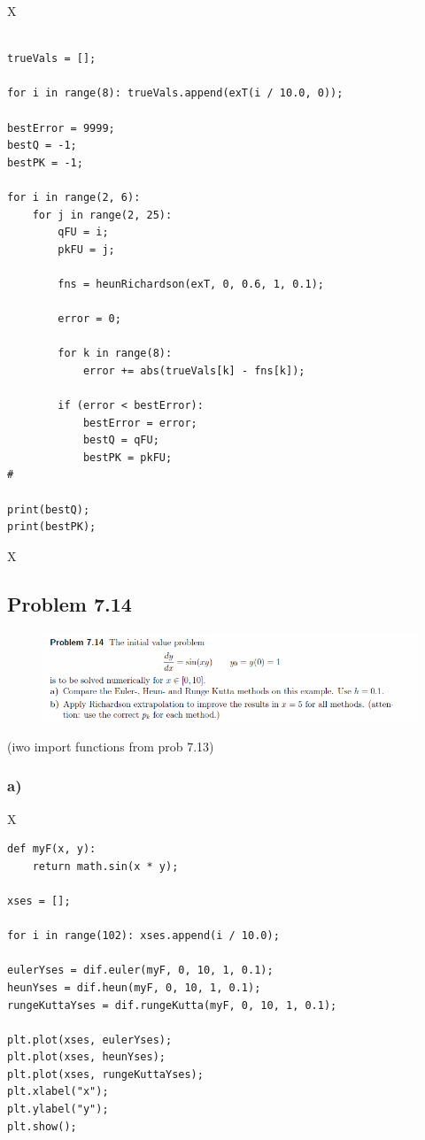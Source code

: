 X

\begin{lstlisting}[caption=todo]

trueVals = [];

for i in range(8): trueVals.append(exT(i / 10.0, 0));

bestError = 9999;
bestQ = -1;
bestPK = -1;

for i in range(2, 6):
	for j in range(2, 25):
		qFU = i;
		pkFU = j;
	
		fns = heunRichardson(exT, 0, 0.6, 1, 0.1);
		
		error = 0;
		
		for k in range(8):
			error += abs(trueVals[k] - fns[k]);
		
		if (error < bestError):
			bestError = error;
			bestQ = qFU;
			bestPK = pkFU;
#

print(bestQ);
print(bestPK);

\end{lstlisting}



X



\subsection{Problem 7.14}


\begin{figure}[!ht]
\includegraphics[width=1\textwidth]{chapters/images/desc-7-14}
\end{figure}

(iwo import functions from prob 7.13)

\subsubsection{a)}

X

\begin{lstlisting}[caption=todo]
def myF(x, y):
	return math.sin(x * y);

xses = [];

for i in range(102): xses.append(i / 10.0);

eulerYses = dif.euler(myF, 0, 10, 1, 0.1);
heunYses = dif.heun(myF, 0, 10, 1, 0.1);
rungeKuttaYses = dif.rungeKutta(myF, 0, 10, 1, 0.1);

plt.plot(xses, eulerYses);
plt.plot(xses, heunYses);
plt.plot(xses, rungeKuttaYses);
plt.xlabel("x");
plt.ylabel("y");
plt.show();
\end{lstlisting}


